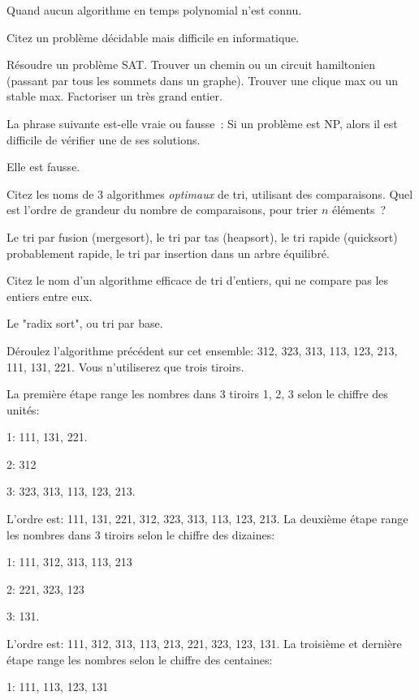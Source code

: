 \documentclass[11pt]{article}
\begin{document}
{\medskip

Quand aucun algorithme en temps polynomial n'est connu.

 Citez un problème décidable mais difficile en  informatique.

\medskip

Résoudre un problème SAT. Trouver un chemin ou un circuit hamiltonien (passant par tous les sommets dans un graphe). Trouver une clique max ou un stable max. Factoriser un très grand entier.


 La phrase suivante est-elle vraie ou fausse~: Si un problème est NP, alors il est difficile de vérifier une de ses solutions. 

\medskip
Elle est fausse.

 {Citez les noms de 3 algorithmes {\it  optimaux}  de tri, utilisant des comparaisons. Quel est l'ordre de grandeur du nombre de comparaisons, pour trier $n$ éléments~?}
  
\medskip
Le tri par fusion (mergesort), le tri par tas (heapsort), le tri rapide (quicksort) probablement rapide, le tri par insertion dans un arbre équilibré.


 {Citez le nom d'un algorithme efficace de tri d'entiers, qui ne compare pas les entiers entre eux.}
  
\medskip

Le "radix sort", ou tri par base.
  

 {Déroulez l'algorithme précédent sur cet ensemble: 312, 323, 313, 113, 123, 213, 111, 131, 221. Vous n'utiliserez que trois tiroirs.}
  
\medskip

La première étape range les nombres dans 3 tiroirs 1, 2, 3 selon le chiffre des unités: 

 1: 111, 131, 221.

 2: 312

 3: 323, 313, 113, 123, 213.

L'ordre est: 111, 131, 221, 312,  323, 313, 113, 123, 213.  
La deuxième étape  range les nombres dans 3 tiroirs  selon le chiffre des dizaines:

 1: 111,  312,  313, 113,  213

 2:  221, 323, 123

 3: 131.

L'ordre est:  111,  312,  313, 113,  213, 221, 323, 123, 131.
La troisième et dernière étape  range les nombres  selon le chiffre des centaines:

 1:  111, 113,  123, 131

}
\end{document}

